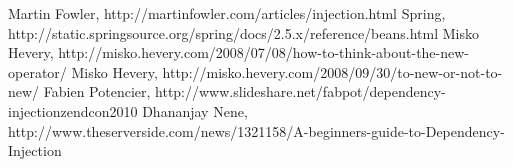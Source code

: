 \documentclass[a4paper,conference]{IEEEtran}
\begin{document}


% 
% 
% 
% 






%
%
%
\begin{thebibliography}{1}

Martin Fowler, http://martinfowler.com/articles/injection.html
Spring, http://static.springsource.org/spring/docs/2.5.x/reference/beans.html
Misko Hevery, http://misko.hevery.com/2008/07/08/how-to-think-about-the-new-operator/
Misko Hevery, http://misko.hevery.com/2008/09/30/to-new-or-not-to-new/
Fabien Potencier, http://www.slideshare.net/fabpot/dependency-injectionzendcon2010
Dhananjay Nene, http://www.theserverside.com/news/1321158/A-beginners-guide-to-Dependency-Injection

\end{thebibliography}




\end{document}
